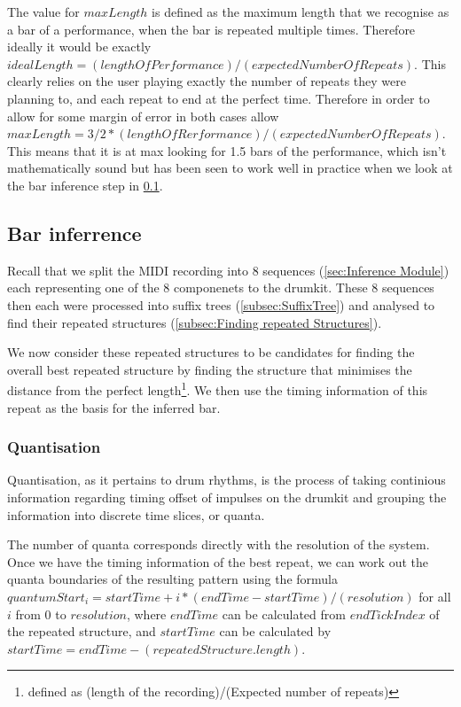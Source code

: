 \documentclass[12pt,twoside,notitlepage]{report}
\begin{document}
		The value for $maxLength$ is defined as the maximum length that we recognise as a bar of a performance, when the bar is repeated multiple times. Therefore ideally it would be exactly $idealLength = (lengthOfPerformance)/(expectedNumberOfRepeats)$. This clearly relies on the user playing exactly the number of repeats they were planning to, and each repeat to end at the perfect time. Therefore in order to allow for some margin of error in both cases allow $maxLength = 3/2*(lengthOfRerformance)/(expectedNumberOfRepeats)$. This means that it is at max looking for 1.5 bars of the performance, which isn't mathematically sound but has been seen to work well in practice when we look at the bar inference step in \ref{subsec:barinference}.
		
		
		\subsection{Bar inferrence}\label{subsec:barinference}
		Recall that we split the MIDI recording into 8 sequences (\ref{sec:Inference Module}) each representing one of the 8 componenets to the drumkit. These 8 sequences then each were processed into suffix trees (\ref{subsec:SuffixTree}) and analysed to find their repeated structures (\ref{subsec:Finding repeated Structures}).
		
		We now consider these repeated structures to be candidates for finding the overall best repeated structure by finding the structure that minimises the distance from the perfect length\footnote{defined as (length of the recording)/(Expected number of repeats)}. We then use the timing information of this repeat as the basis for the inferred bar.
		
			\subsubsection{Quantisation}
			Quantisation, as it pertains to drum rhythms, is the process of taking continious information regarding timing offset of impulses on the drumkit and grouping the information into discrete time slices, or quanta. 
			
			The number of quanta corresponds directly with the resolution of the system. Once we have the timing information of the best repeat, we can work out the quanta boundaries of the resulting pattern using the formula $quantumStart_i = startTime + i*(endTime-startTime)/(resolution)$ for all $i$ from $0$ to $resolution$, where $endTime$ can be calculated from $endTickIndex$ of the repeated structure, and $startTime$ can be calculated by $startTime = endTime-(repeatedStructure.length)$.
			
\end{document}

